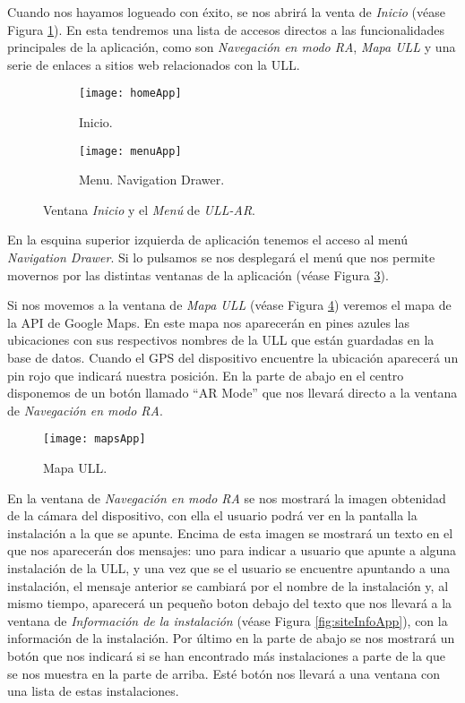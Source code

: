 Cuando nos hayamos logueado con éxito, se nos abrirá la venta de \textit{Inicio} (véase Figura \ref{fig:homeApp}). En esta tendremos una lista de accesos directos a las funcionalidades principales de la aplicación, como son \textit{Navegación en modo RA}, \textit{Mapa ULL} y una serie de enlaces a sitios web relacionados con la ULL.

\begin{figure}[h]
    \hspace*{\fill}%
    \begin{subfigure}[h]{0.35\linewidth}
    \texttt{[image: homeApp]}
    \caption{Inicio.}
    \label{fig:homeApp}
    \end{subfigure}
    \hfill%
    \begin{subfigure}[h]{0.35\linewidth}
    \texttt{[image: menuApp]}
    \caption{Menu. Navigation Drawer.}
    \label{fig:menuApp}
    \end{subfigure}%
    \caption{Ventana \textit{Inicio} y el \textit{Menú} de \textit{ULL-AR}.}
    \hspace*{\fill}%
\end{figure}

En la esquina superior izquierda de aplicación tenemos el acceso al menú \textit{Navigation Drawer}. Si lo pulsamos se nos desplegará el menú que nos permite movernos por las distintas ventanas de la aplicación (véase Figura \ref{fig:menuApp}).

Si nos movemos a la ventana de \textit{Mapa ULL} (véase Figura \ref{fig:mapsApp}) veremos el mapa de la API de Google Maps. En este mapa nos aparecerán en pines azules las ubicaciones con sus respectivos nombres de la ULL que están guardadas en la base de datos. Cuando el GPS del dispositivo encuentre la ubicación aparecerá un pin rojo que indicará nuestra posición. En la parte de abajo en el centro disponemos de un botón llamado ``AR Mode'' que nos llevará directo a la ventana de \textit{Navegación en modo RA}.
  
\begin{figure}[h]
    \centering
    \texttt{[image: mapsApp]}
    \caption{Mapa ULL.}
    \label{fig:mapsApp}
\end{figure}

En la ventana de \textit{Navegación en modo RA} se nos mostrará la imagen obtenidad de la cámara del dispositivo, con ella el usuario podrá ver en la pantalla la instalación a la que se apunte. Encima de esta imagen se mostrará un texto en el que nos aparecerán dos mensajes: uno para indicar a usuario que apunte a alguna instalación de la ULL, y una vez que se el usuario se encuentre apuntando a una instalación, el mensaje anterior se cambiará por el nombre de la instalación y, al mismo tiempo, aparecerá un pequeño boton debajo del texto que nos llevará a la ventana de \textit{Información de la instalación} (véase Figura \ref{fig:siteInfoApp}), con la información de la instalación. Por último en la parte de abajo se nos mostrará un botón que nos indicará si se han encontrado más instalaciones a parte de la que se nos muestra en la parte de arriba. Esté botón nos llevará a una ventana con una lista de estas instalaciones.



